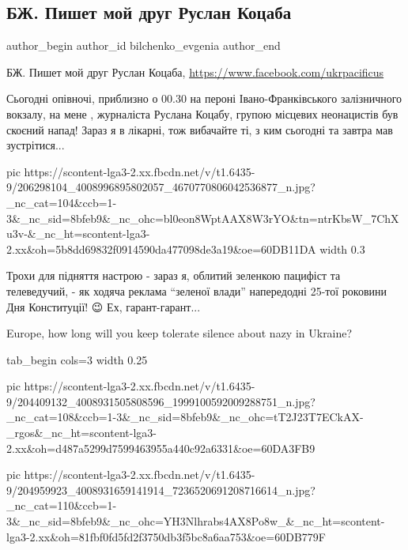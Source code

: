  
 
 
 
 
 
\subsection{БЖ. Пишет мой друг Руслан Коцаба}
\label{sec:25_06_2021.fb.bilchenko_evgenia.2.ruslan_kocaba_izbienie}
\ifcmt
 author_begin
   author_id bilchenko_evgenia
 author_end
\fi

БЖ. Пишет мой друг Руслан Коцаба, \url{https://www.facebook.com/ukrpacificus}

Сьогодні опівночі,  приблизно о 00.30 на пероні Івано-Франківського
залізничного вокзалу,  на мене , журналіста Руслана Коцабу, групою місцевих
неонацистів був скоєний напад! Зараз я в лікарні, тож вибачайте ті, з ким
сьогодні та завтра мав зустрітися... 

\ifcmt
  pic https://scontent-lga3-2.xx.fbcdn.net/v/t1.6435-9/206298104_4008996895802057_4670770806042536877_n.jpg?_nc_cat=104&ccb=1-3&_nc_sid=8bfeb9&_nc_ohc=bl0eon8WptAAX8W3rYO&tn=ntrKbsW_7ChXu3v-&_nc_ht=scontent-lga3-2.xx&oh=5b8dd69832f0914590da477098de3a19&oe=60DB11DA
	width 0.3
\fi

Трохи для підняття настрою - зараз я, облитий зеленкою пацифіст та телеведучий,
- як ходяча реклама \enquote{зеленої влади} напередодні 25-тої роковини Дня
Конституції! 😉 Ех, гарант-гарант... 🙁

Europe, how long will you keep tolerate silence about nazy in Ukraine?


\ifcmt
  tab_begin cols=3
	width 0.25

     pic https://scontent-lga3-2.xx.fbcdn.net/v/t1.6435-9/204409132_4008931505808596_1999100592009288751_n.jpg?_nc_cat=108&ccb=1-3&_nc_sid=8bfeb9&_nc_ohc=tT2J23T7ECkAX-_rgos&_nc_ht=scontent-lga3-2.xx&oh=d487a5299d7599463955a440c92a6331&oe=60DA3FB9

     pic https://scontent-lga3-2.xx.fbcdn.net/v/t1.6435-9/204959923_4008931659141914_7236520691208716614_n.jpg?_nc_cat=110&ccb=1-3&_nc_sid=8bfeb9&_nc_ohc=YH3Nlhrabs4AX8Po8w_&_nc_ht=scontent-lga3-2.xx&oh=81fbf0fd5fd2f3750db3f5bc8a6aa753&oe=60DB779F


